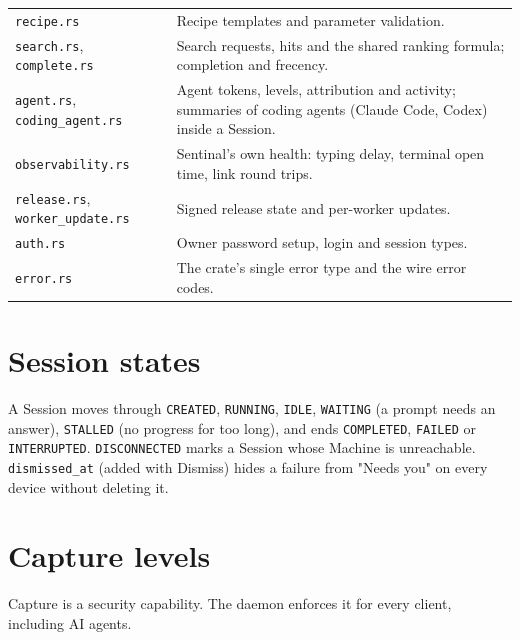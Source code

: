 \begin{small}
\begin{longtable}{>{\raggedright\arraybackslash}p{0.356\dimexpr \linewidth-4\tabcolsep\relax}>{\raggedright\arraybackslash}p{0.644\dimexpr \linewidth-4\tabcolsep\relax}}
\texttt{recipe.\allowbreak{}rs} & Recipe templates and parameter validation. \\
\texttt{search.\allowbreak{}rs}, \texttt{complete.\allowbreak{}rs} & Search requests, hits and the shared ranking formula; completion and frecency. \\
\texttt{agent.\allowbreak{}rs}, \texttt{coding\_\allowbreak{}agent.\allowbreak{}rs} & Agent tokens, levels, attribution and activity; summaries of coding agents (Claude Code, Codex) inside a Session. \\
\texttt{observability.\allowbreak{}rs} & Sentinal's own health: typing delay, terminal open time, link round trips. \\
\texttt{release.\allowbreak{}rs}, \texttt{worker\_\allowbreak{}update.\allowbreak{}rs} & Signed release state and per-worker updates. \\
\texttt{auth.\allowbreak{}rs} & Owner password setup, login and session types. \\
\texttt{error.\allowbreak{}rs} & The crate's single error type and the wire error codes. \\
\bottomrule
\end{longtable}
\end{small}

\section{\texorpdfstring{Session states}{Session states}}

A Session moves through \texttt{CREATED}, \texttt{RUNNING}, \texttt{IDLE}, \texttt{WAITING} (a prompt needs an answer), \texttt{STALLED} (no progress for too long), and ends \texttt{COMPLETED}, \texttt{FAILED} or \texttt{INTERRUPTED}. \texttt{DISCONNECTED} marks a Session whose Machine is unreachable. \texttt{dismissed\_\allowbreak{}at} (added with Dismiss) hides a failure from "Needs you" on every device without deleting it.

\section{\texorpdfstring{Capture levels}{Capture levels}}

Capture is a security capability. The daemon enforces it for every client, including AI agents.

